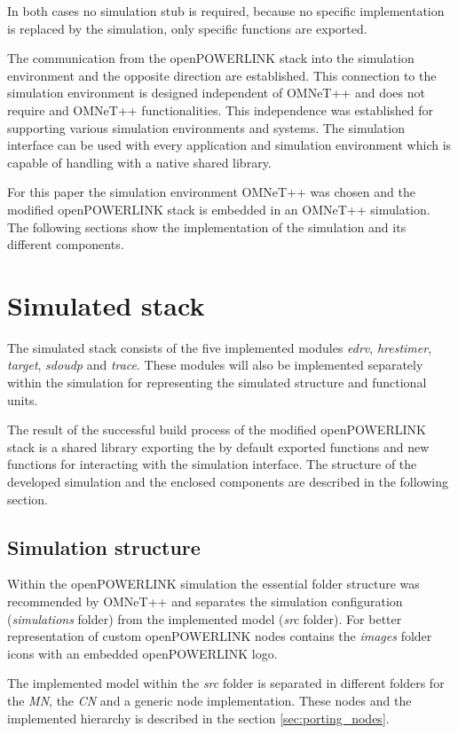 In both cases no simulation stub is required, because no specific implementation is replaced by the simulation, only specific functions are exported.

The communication from the openPOWERLINK stack into the simulation environment and the opposite direction are established.
This connection to the simulation environment is designed independent of OMNeT++ and does not require and OMNeT++ functionalities.
This independence was established for supporting various simulation environments and systems.
The simulation interface can be used with every application and simulation environment which is capable of handling with a native shared library.

For this paper the simulation environment OMNeT++ was chosen and the modified openPOWERLINK stack is embedded in an OMNeT++ simulation.
The following sections show the implementation of the simulation and its different components.

\section{Simulated stack}
\label{sec:porting_stack}
The simulated stack consists of the five implemented modules \emph{edrv}, \emph{hrestimer}, \emph{target}, \emph{sdoudp} and \emph{trace}.
These modules will also be implemented separately within the simulation for representing the simulated structure and functional units.

The result of the successful build process of the modified openPOWERLINK stack is a shared library exporting the by default exported functions and new functions for interacting with the simulation interface.
The structure of the developed simulation and the enclosed components are described in the following section.

\subsection{Simulation structure}
\label{sec:porting_stack_simstructure}
Within the openPOWERLINK simulation the essential folder structure was recommended by OMNeT++ and separates the simulation configuration (\emph{simulations} folder) from the implemented model (\emph{src} folder).
For better representation of custom openPOWERLINK nodes contains the \emph{images} folder icons with an embedded openPOWERLINK logo.

The implemented model within the \emph{src} folder is separated in different folders for the \emph{MN}, the \emph{CN} and a generic node implementation.
These nodes and the implemented hierarchy is described in the section \ref{sec:porting_nodes}.

